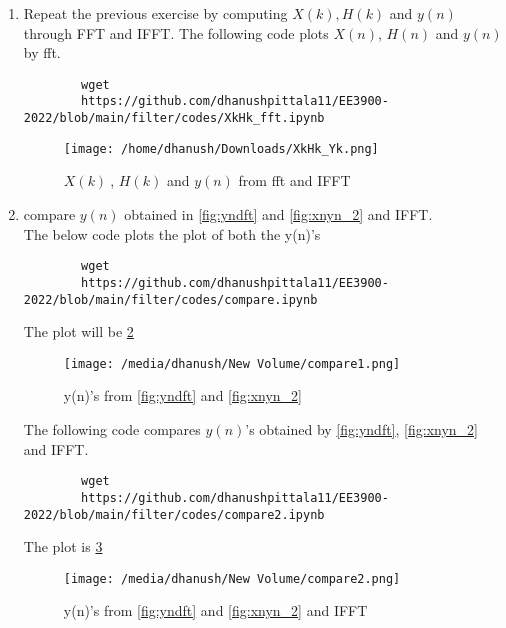 \documentclass[journal,12pt,twocolumn]{IEEEtran}
\renewcommand\thesection{\arabic{section}}
\begin{document}
\begin{enumerate}[label=\thesection.\arabic*]
	\item Repeat the previous exercise by computing $X(k), H(k)$ and $y(n)$ through FFT and 
	IFFT.
	\solution The following code plots $X(n)$, $H(n)$ and $y(n)$ by fft.
	\begin{lstlisting}
		wget
		https://github.com/dhanushpittala11/EE3900-2022/blob/main/filter/codes/XkHk_fft.ipynb
	\end{lstlisting}
	
	\begin{figure}[!ht]
		\centering
		\texttt{[image: /home/dhanush/Downloads/XkHk\_Yk.png]}
		\caption{$X(k)~$, $H(k)$ and $y(n)$ from fft and IFFT}
		\label{fig:Xk_Hk_yn}
	\end{figure}
	
	\item compare $y(n)$ obtained in \ref{fig:yndft} and \ref{fig:xnyn_2} and IFFT.\\
	\solution 
	The below code plots the plot of both the y(n)'s 
	
	\begin{lstlisting}
		wget
		https://github.com/dhanushpittala11/EE3900-2022/blob/main/filter/codes/compare.ipynb
	\end{lstlisting}
	
	The plot will be \ref{fig:2y(n)'s}
	
	\begin{figure}[!ht]
		\centering
		\texttt{[image: /media/dhanush/New Volume/compare1.png]}
		\caption{y(n)'s from \ref{fig:yndft} and \ref{fig:xnyn_2}}
		\label{fig:2y(n)'s}
	\end{figure}
	
	The following code compares $y(n)$'s obtained by \ref{fig:yndft}, \ref{fig:xnyn_2} and IFFT.
	\begin{lstlisting}
		wget
		https://github.com/dhanushpittala11/EE3900-2022/blob/main/filter/codes/compare2.ipynb
	\end{lstlisting}
	
	The plot is \ref{fig:3y(n)'s}
	
	\begin{figure}[!ht]
		\centering
		\texttt{[image: /media/dhanush/New Volume/compare2.png]}
		\caption{y(n)'s from \ref{fig:yndft} and \ref{fig:xnyn_2} and IFFT}
		\label{fig:3y(n)'s}
	\end{figure}
	

\end{enumerate}
\end{document}
